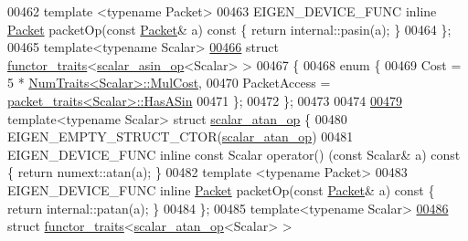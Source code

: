 \begin{DoxyCode}
00462   \textcolor{keyword}{template} <\textcolor{keyword}{typename} Packet>
00463   EIGEN\_DEVICE\_FUNC \textcolor{keyword}{inline} \hyperlink{union_eigen_1_1internal_1_1_packet}{Packet} packetOp(\textcolor{keyword}{const} \hyperlink{union_eigen_1_1internal_1_1_packet}{Packet}& a)\textcolor{keyword}{ const }\{ \textcolor{keywordflow}{return} internal::pasin(a); 
      \}
00464 \};
00465 \textcolor{keyword}{template}<\textcolor{keyword}{typename} Scalar>
\hyperlink{struct_eigen_1_1internal_1_1functor__traits_3_01scalar__asin__op_3_01_scalar_01_4_01_4}{00466} \textcolor{keyword}{struct }\hyperlink{struct_eigen_1_1internal_1_1functor__traits}{functor\_traits}<\hyperlink{struct_eigen_1_1internal_1_1scalar__asin__op}{scalar\_asin\_op}<Scalar> >
00467 \{
00468   \textcolor{keyword}{enum} \{
00469     Cost = 5 * \hyperlink{group___core___module_struct_eigen_1_1_num_traits}{NumTraits<Scalar>::MulCost},
00470     PacketAccess = \hyperlink{struct_eigen_1_1internal_1_1packet__traits}{packet\_traits<Scalar>::HasASin}
00471   \};
00472 \};
00473 
00474 
\hyperlink{struct_eigen_1_1internal_1_1scalar__atan__op}{00479} \textcolor{keyword}{template}<\textcolor{keyword}{typename} Scalar> \textcolor{keyword}{struct }\hyperlink{struct_eigen_1_1internal_1_1scalar__atan__op}{scalar\_atan\_op} \{
00480   EIGEN\_EMPTY\_STRUCT\_CTOR(\hyperlink{struct_eigen_1_1internal_1_1scalar__atan__op}{scalar\_atan\_op})
00481   EIGEN\_DEVICE\_FUNC \textcolor{keyword}{inline} \textcolor{keyword}{const} Scalar operator() (\textcolor{keyword}{const} Scalar& a)\textcolor{keyword}{ const }\{ \textcolor{keywordflow}{return} numext::atan(a); \}
00482   \textcolor{keyword}{template} <\textcolor{keyword}{typename} Packet>
00483   EIGEN\_DEVICE\_FUNC \textcolor{keyword}{inline} \hyperlink{union_eigen_1_1internal_1_1_packet}{Packet} packetOp(\textcolor{keyword}{const} \hyperlink{union_eigen_1_1internal_1_1_packet}{Packet}& a)\textcolor{keyword}{ const }\{ \textcolor{keywordflow}{return} internal::patan(a); 
      \}
00484 \};
00485 \textcolor{keyword}{template}<\textcolor{keyword}{typename} Scalar>
\hyperlink{struct_eigen_1_1internal_1_1functor__traits_3_01scalar__atan__op_3_01_scalar_01_4_01_4}{00486} \textcolor{keyword}{struct }\hyperlink{struct_eigen_1_1internal_1_1functor__traits}{functor\_traits}<\hyperlink{struct_eigen_1_1internal_1_1scalar__atan__op}{scalar\_atan\_op}<Scalar> >

\end{DoxyCode}
